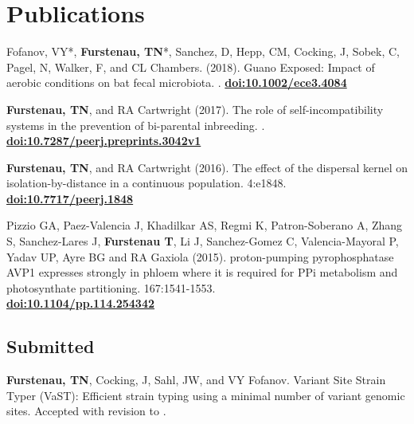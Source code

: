 \documentclass[]{cv-style}          %
\begin{document}

\section{Publications}
Fofanov, VY*, \textbf{Furstenau, TN}*, Sanchez, D, Hepp, CM, Cocking, J, Sobek, C, Pagel, N, Walker, F, and CL Chambers. (2018). Guano Exposed: Impact of aerobic conditions on bat fecal microbiota. . \textbf{\href{https://doi.org/10.1002/ece3.4084}{doi:10.1002/ece3.4084}}

\textbf{Furstenau, TN}, and RA Cartwright (2017). The role of self-incompatibility systems in the prevention of bi-parental inbreeding. . \textbf{\href{| https://doi.org/10.7287/peerj.preprints.3042v1}{doi:10.7287/peerj.preprints.3042v1}}

\textbf{Furstenau, TN}, and RA Cartwright (2016). The effect of the dispersal kernel on isolation-by-distance in a continuous population.  4:e1848. \textbf{\href{https://doi.org/10.7717/peerj.1848}{doi:10.7717/peerj.1848}}

Pizzio GA, Paez-Valencia J, Khadilkar AS, Regmi K, Patron-Soberano A, Zhang S, Sanchez-Lares J, \textbf{Furstenau T}, Li J, Sanchez-Gomez C, Valencia-Mayoral P, Yadav UP, Ayre BG and RA Gaxiola (2015). proton-pumping pyrophosphatase AVP1 expresses strongly in phloem where it is required for PPi metabolism and photosynthate partitioning.  167:1541-1553.\\ \textbf{\href{http://dx.doi.org/10.1104/pp.114.254342}{doi:10.1104/pp.114.254342}}

\subsection{Submitted}
\textbf{Furstenau, TN}, Cocking, J, Sahl, JW, and VY Fofanov. Variant Site Strain Typer (VaST): Efficient strain typing using a minimal number of variant genomic sites. Accepted with revision to .



\pagebreak
\end{document}
